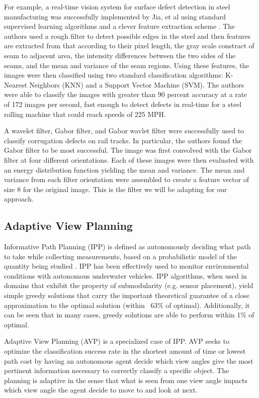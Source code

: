 \documentclass[letterpaper, 10 pt, conference]{ieeeconf}  %
\begin{document}
For example, a real-time vision system for surface defect detection in steel manufacturing was successfully implemented by Jia, et al using standard supervised learning algorithms and a clever feature extraction scheme \cite{steelDefect}. The authors used a rough filter to detect possible edges in the steel and then features are extracted from that according to their pixel length, the gray scale constract of seam to adjacent area, the intensity differences between the two sides of the seams, and the mean and variance of the seam regions. Using these features, the images were then classified using two standard classification algorithms: K-Nearest Neighbors (KNN) and a Support Vector Machine (SVM). The authors were able to classify the images with greater than 90 percent accuracy at a rate of 172 images per second, fast enough to detect defects in real-time for a steel rolling machine that could reach speeds of 225 MPH.

A wavelet filter, Gabor filter, and Gabor wavlet filter were successfully used to classify corrugation defects on rail tracks\cite{railDefect}. In particular, the authors found the Gabor filter to be most successful. The image was first convolved with the Gabor filter at four different orientations. Each of these images were then evaluated with an energy distribution function yielding the mean and variance.  The mean and variance from each filter orientation were assembled to create a feature vector of size 8 for the original image. This is the filter we will be adapting for our approach.

\subsection{Adaptive View Planning}

Informative Path Planning (IPP) is defined as autonomously deciding what path to take while collecting measurements, based on a probabilistic model of the quantity being studied \cite{BNBIPP}. IPP has been effectively used to monitor environmental conditions with autonomous underwater vehicles\cite{BNBIPP}\cite{underwaterIPP}. IPP algorithms, when used in domains that exhibit the property of submodularity (e.g. sensor placement), yield simple greedy solutions that carry the important theoretical guarantee of a close approximation to the optimal solution (within ~63\% of optimal). Additionally, it can be seen that in many cases, greedy solutions are able to perform within 1\% of optimal. 

Adaptive View Planning (AVP) is a specialized case of IPP. AVP seeks to optimize the classification success rate in the shortest amount of time or lowest path cost by having an autonomous agent decide which view angles give the most pertinent information necessary to correctly classify a specific object. The planning is adaptive in the sense that what is seen from one view angle impacts which view angle the agent decide to move to and look at next\cite{hollinger2011active}. 
\end{document}

